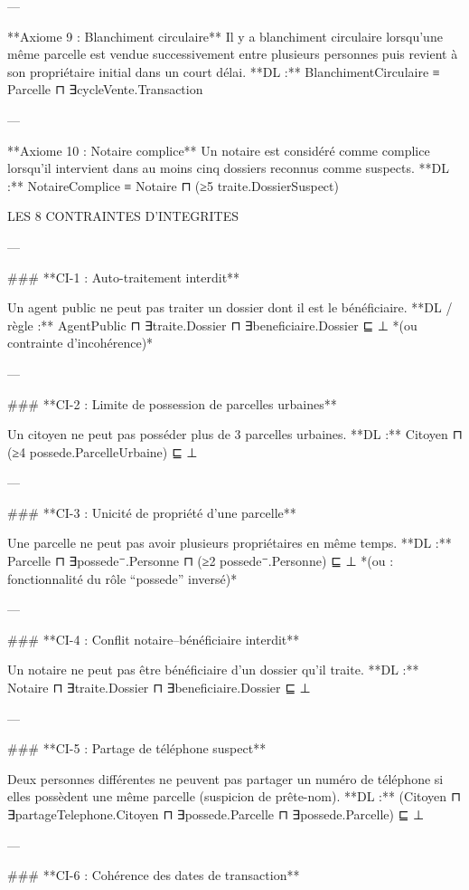 ---

**Axiome 9 : Blanchiment circulaire**
Il y a blanchiment circulaire lorsqu'une même parcelle est vendue successivement entre plusieurs personnes puis revient à son propriétaire initial dans un court délai.
**DL :**
BlanchimentCirculaire ≡ Parcelle ⊓ ∃cycleVente.Transaction

---

**Axiome 10 : Notaire complice**
Un notaire est considéré comme complice lorsqu'il intervient dans au moins cinq dossiers reconnus comme suspects.
**DL :**
NotaireComplice ≡ Notaire ⊓ (≥5 traite.DossierSuspect)


LES 8 CONTRAINTES D'INTEGRITES



---

### **CI-1 : Auto-traitement interdit**

Un agent public ne peut pas traiter un dossier dont il est le bénéficiaire.
**DL / règle :**
AgentPublic ⊓ ∃traite.Dossier ⊓ ∃beneficiaire.Dossier ⊑ ⊥
*(ou contrainte d’incohérence)*

---

### **CI-2 : Limite de possession de parcelles urbaines**

Un citoyen ne peut pas posséder plus de 3 parcelles urbaines.
**DL :**
Citoyen ⊓ (≥4 possede.ParcelleUrbaine) ⊑ ⊥

---

### **CI-3 : Unicité de propriété d’une parcelle**

Une parcelle ne peut pas avoir plusieurs propriétaires en même temps.
**DL :**
Parcelle ⊓ ∃possede⁻.Personne ⊓ (≥2 possede⁻.Personne) ⊑ ⊥
*(ou : fonctionnalité du rôle “possede” inversé)*

---

### **CI-4 : Conflit notaire–bénéficiaire interdit**

Un notaire ne peut pas être bénéficiaire d’un dossier qu’il traite.
**DL :**
Notaire ⊓ ∃traite.Dossier ⊓ ∃beneficiaire.Dossier ⊑ ⊥

---

### **CI-5 : Partage de téléphone suspect**

Deux personnes différentes ne peuvent pas partager un numéro de téléphone si elles possèdent une même parcelle (suspicion de prête-nom).
**DL :**
(Citoyen ⊓ ∃partageTelephone.Citoyen ⊓ ∃possede.Parcelle ⊓ ∃possede.Parcelle) ⊑ ⊥

---

### **CI-6 : Cohérence des dates de transaction**

